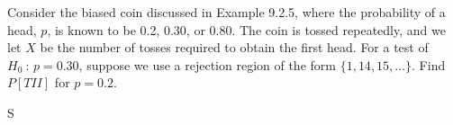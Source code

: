 \documentclass[answers]{exam}
\begin{document}
\begin{questions}
\question 
Consider the biased coin discussed in Example 9.2.5, where the probability of a
head, \(p\), is known to be 0.2, 0.30, or 0.80. 
The coin is tossed repeatedly, and we let \(X\) be the number of tosses 
required to obtain the first head. For a test of \(H_0\ :\,p=0.30\), 
suppose we use a rejection region of the form \(\{1,14,15,\ldots\}\). 
Find \(P\left[TII\right]\) for \(p=0.2\).
\begin{solution}
	S
\end{solution}

\end{questions}
\end{document}

